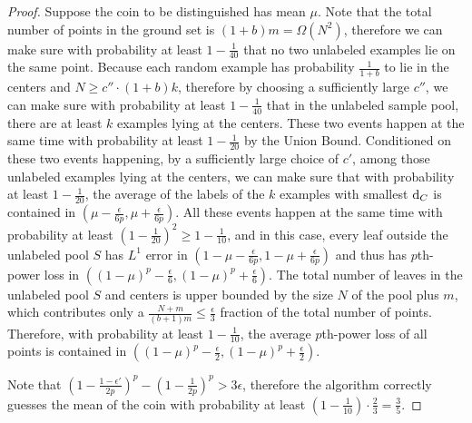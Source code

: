\begin{proof}
Suppose the coin to be distinguished has mean $\mu$. Note that the total number of points in the ground set is $(1+b)m=\Omega(N^2)$, therefore we can make sure with probability at least $1-\frac{1}{40}$ that no two unlabeled examples lie on the same point. Because each random example has probability $\frac{1}{1+b}$ to lie in the centers and $N\geq c''\cdot (1+b)k$, therefore by choosing a sufficiently large $c''$, we can make sure with probability at least $1-\frac{1}{40}$ that in the unlabeled sample pool, there are at least $k$ examples lying at the centers. These two events happen at the same time with probability at least $1-\frac{1}{20}$ by the Union Bound. Conditioned on these two events happening, by a sufficiently large choice of $c'$, among those unlabeled examples lying at the centers, we can make sure that with probability at least $1-\frac{1}{20}$, the average of the labels of the $k$ examples with smallest ${\mathrm{d}}_C$ is contained in $(\mu-\frac{\epsilon}{6p},\mu+\frac{\epsilon}{6p})$. All these events happen at the same time with probability at least $(1-\frac{1}{20})^2\geq 1-\frac{1}{10}$, and in this case, every leaf outside the unlabeled pool $S$ has $L^1$ error in $(1-\mu-\frac{\epsilon}{6p},1-\mu+\frac{\epsilon}{6p})$ and thus has $p$th-power loss in $((1-\mu)^p-\frac{\epsilon}{6},(1-\mu)^p+\frac{\epsilon}{6})$. The total number of leaves in the unlabeled pool $S$ and centers is upper bounded by the size $N$ of the pool plus $m$, which contributes only a $\frac{N+m}{(b+1)m}\leq\frac{\epsilon}{3}$ fraction of the total number of points. Therefore, with probability at least $1-\frac{1}{10}$, the average $p$th-power loss of all points is contained in $((1-\mu)^p-\frac{\epsilon}{2},(1-\mu)^p+\frac{\epsilon}{2})$. %

Note that $(1-\frac{1-\epsilon'}{2p})^p-(1-\frac{1}{2p})^p>3\epsilon$, therefore the algorithm correctly guesses the mean of the coin with probability at least $(1-\frac{1}{10})\cdot\frac{2}{3}=\frac{3}{5}$.
\end{proof}


